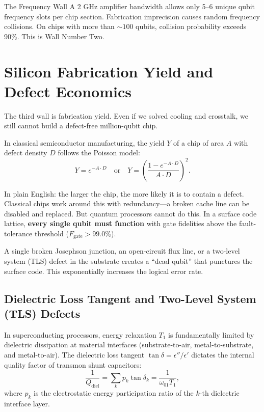 \begin{summarybox}{The Frequency Wall}
A 2 GHz amplifier bandwidth allows only 5--6 unique qubit frequency slots per chip section. Fabrication imprecision causes random frequency collisions. On chips with more than $\sim 100$ qubits, collision probability exceeds 90\%. This is Wall Number Two.
\end{summarybox}


\section{Silicon Fabrication Yield and Defect Economics}
\label{sec:fabrication_yield}

The third wall is fabrication yield. Even if we solved cooling and crosstalk, we still cannot build a defect-free million-qubit chip.

In classical semiconductor manufacturing, the yield $Y$ of a chip of area $A$ with defect density $D$ follows the Poisson model:
\begin{equation}
    Y = e^{-A \cdot D} \quad \text{or} \quad Y = \left( \frac{1 - e^{-A \cdot D}}{A \cdot D} \right)^2.
    \label{eq:classical_yield_model}
\end{equation}

In plain English: the larger the chip, the more likely it is to contain a defect. Classical chips work around this with redundancy---a broken cache line can be disabled and replaced. But quantum processors cannot do this. In a surface code lattice, \textbf{every single qubit must function} with gate fidelities above the fault-tolerance threshold ($F_{\text{gate}} > 99.0\%$).

A single broken Josephson junction, an open-circuit flux line, or a two-level system (TLS) defect in the substrate creates a ``dead qubit'' that punctures the surface code. This exponentially increases the logical error rate.

\subsection{Dielectric Loss Tangent and Two-Level System (TLS) Defects}
In superconducting processors, energy relaxation $T_1$ is fundamentally limited by dielectric dissipation at material interfaces (substrate-to-air, metal-to-substrate, and metal-to-air). The dielectric loss tangent $\tan \delta = \epsilon'' / \epsilon'$ dictates the internal quality factor of transmon shunt capacitors:
\begin{equation}
    \frac{1}{Q_{\text{diel}}} = \sum_k p_k \tan \delta_k = \frac{1}{\omega_{01} T_1},
    \label{eq:dielectric_loss_tangent}
\end{equation}
where $p_k$ is the electrostatic energy participation ratio of the $k$-th dielectric interface layer.

